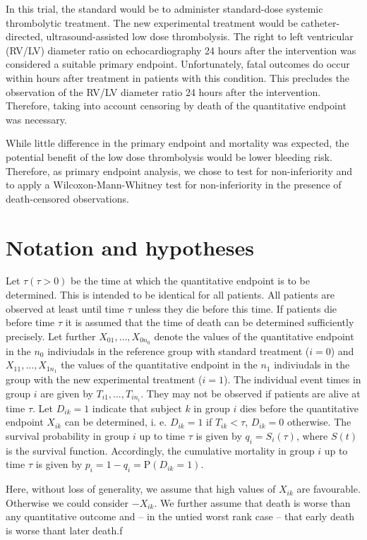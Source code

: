 \documentclass[bimj,fleqn]{w-art}\usepackage[]{graphicx}\usepackage[]{color}
\theoremstyle{plain}
\theoremstyle{definition}
\begin{document}
In this trial, the standard would be to administer standard-dose systemic
thrombolytic treatment. The new experimental treatment would be catheter-directed,
ultrasound-assisted low dose thrombolysis. The right to left ventricular (RV/LV)
diameter ratio on echocardiography 24 hours after the intervention was
considered a suitable primary endpoint. Unfortunately, fatal
outcomes do occur within hours after treatment in patients with this condition.
This precludes the observation of the RV/LV diameter ratio 24 hours after the
intervention. Therefore, taking into account censoring by death of the
quantitative endpoint was necessary.

While little difference in the primary endpoint and mortality was expected,
the potential benefit of the low dose thrombolysis would be lower bleeding
risk. Therefore, as primary endpoint analysis, we chose to test for
non-inferiority and to apply a Wilcoxon-Mann-Whitney test for non-inferiority
in the presence of death-censored observations.

\section{Notation and hypotheses}
\label{sec:Notation}
Let  $\tau (\tau > 0)$ be the time at which the quantitative endpoint is to
be determined. This is intended to be identical for all patients. All patients
are observed at least until time $\tau$ unless they die before this time. If patients
die before time $\tau$ it is assumed that the time of death can be determined
sufficiently precisely. Let further $X_{01}, \ldots, X_{0n_0}$ denote the values
of the quantitative endpoint in the $n_0$ indiviudals in the reference group
with standard treatment ($i=0$) and $X_{11}, \ldots, X_{1n_1}$ the values of the
quantitative endpoint in the $n_1$ indiviudals in the group with the new
experimental treatment ($i=1$). The individual event times in group $i$ are
given by $T_{i1}, \ldots, T_{in_i}$. They may not be observed if patients are
alive at time $\tau$. Let $D_{ik} = 1$ indicate that subject $k$ in group $i$
dies before the quantitative endpoint $X_{ik}$ can be determined, i. e.
$D_{ik} = 1$ if $T_{ik} < \tau $, $D_{ik} = 0$ otherwise. The survival
probability in group $i$ up to time $\tau$ is given by $q_i = S_i(\tau)$, where
$S(t)$ is the survival function. Accordingly, the cumulative mortality in group
$i$ up to time $\tau$ is given by $p_i = 1 - q_i = \text{P}(D_{ik} = 1)$.

Here, without loss of generality, we assume that high values of $X_{ik}$ are
favourable. Otherwise we could consider $-X_{ik}$. We further assume that
death is worse than any quantitative outcome and -- in the untied worst rank
case -- that early death is worse thant later death.f
\end{document}
